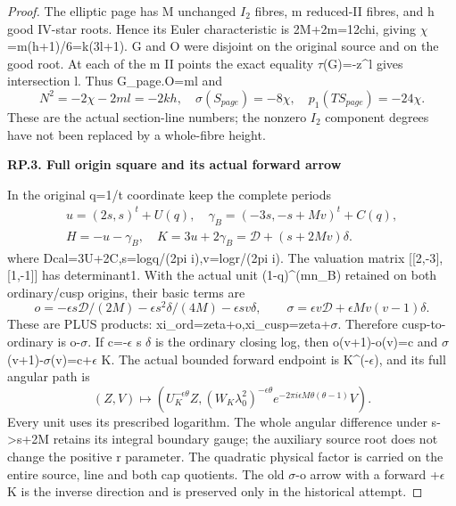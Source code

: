 \begin{proof}
The elliptic page has M unchanged \(I_2\) fibres, m reduced-II fibres,
and h good IV-star roots. Hence its Euler characteristic is
2M+2m=12chi, giving \(\chi\)=m(h+1)/6=k(3l+1). G and O were disjoint
on the original source and on the good root. At each of the m II
points the exact equality \(\tau\)\textquotesingle(G\textquotesingle)=-z\^{}l gives intersection l.
Thus G\_page.O=ml and
\[
N^2=-2\chi-2ml=-2kh,\quad
\sigma(S_{page})=-8\chi,\quad p_1(TS_{page})=-24\chi.
\tag{RP.8}
\]
These are the actual section-line numbers; the nonzero \(I_2\) component
degrees have not been replaced by a whole-fibre height.

\par

\medskip\noindent\textbf{RP.3. Full origin square and its actual forward arrow}

\par\nobreak

In the original q=1/t coordinate keep the complete periods
\[
\begin{gathered}u=(2s,s)^t+U(q),\quad\gamma_B=(-3s,-s+Mv)^t+C(q),\\
H=-u-\gamma_B,\quad K=3u+2\gamma_B=\mathcal D+(s+2Mv)\delta.\end{gathered}
\tag{RP.9}
\]
where Dcal=3U+2C,s=logq/(2pi i),v=logr/(2pi i). The valuation
matrix {[}{[}2,-3{]},{[}1,-1{]}{]} has determinant1. With the actual unit
(1-q)\^{}(mn\_B) retained on both ordinary/cusp origins, their basic terms are
\[
o=-\epsilon s\mathcal D/(2M)-\epsilon s^2\delta/(4M)-\epsilon sv\delta,
\qquad\sigma=\epsilon v\mathcal D+\epsilon Mv(v-1)\delta.
\tag{RP.10}
\]
These are PLUS products: xi\_ord=zeta+o,xi\_cusp=zeta+\(\sigma\).
Therefore cusp-to-ordinary is o-\(\sigma\). If c=-\(\epsilon\) s \(\delta\) is
the ordinary closing log, then o(v+1)-o(v)=c and
\(\sigma\)(v+1)-\(\sigma\)(v)=c+\(\epsilon\) K. The actual bounded forward endpoint
is K\^{}(-\(\epsilon\)), and its full angular path is
\[
(Z,V)\mapsto(U_K^{-\epsilon\theta}Z,
 (W_K\lambda_0^2)^{-\epsilon\theta}
                      e^{-2\pi i\epsilon M\theta(\theta-1)}V).
\tag{RP.11}
\]
Every unit uses its prescribed logarithm. The whole angular difference
under s-\textgreater s+2M retains its integral boundary gauge; the auxiliary source
root does not change the positive r parameter. The quadratic physical
factor is carried on the entire source, line and both cap quotients.
The old \(\sigma\)-o arrow with a forward +\(\epsilon\) K is the inverse
direction and is preserved only in the historical attempt.


\end{proof}
